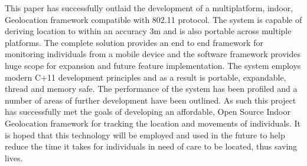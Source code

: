 \documentclass[conference]{IEEEtran}
\begin{document}
This paper has successfully outlaid the development of a multiplatform, indoor, Geolocation framework compatible with 802.11 protocol. The system is capable of deriving location to within an accuracy 3m and is also portable across multiple platforms. The complete solution provides an end to end framework for monitoring individuals from a mobile device and the software framework provides huge scope for expansion and future feature implementation. The system employs modern C+11 development principles and as a result is portable, expandable, thread and memory safe. The performance of the system has been profiled and a number of areas of further development have been outlined. As such this project has successfully met the goals of developing an affordable, Open Source Indoor Geolocation framework for tracking the location and movements of individuals. It is hoped that this technology will be employed and used in the future to help reduce the time it takes for individuals in need of care to be located, thus saving lives.
\printbibliography
\end{document}
